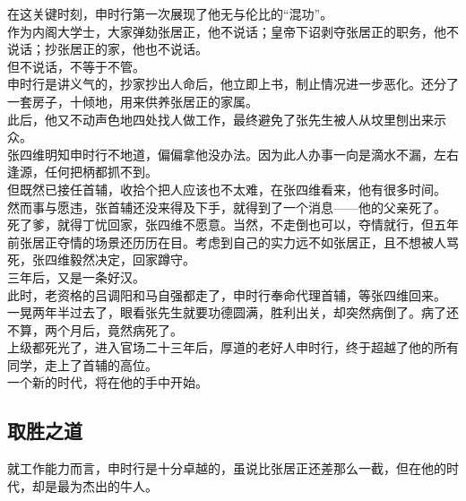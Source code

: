 \begin{multicols}{\theparacolNo}
在这关键时刻，申时行第一次展现了他无与伦比的“混功”。\\

作为内阁大学士，大家弹劾张居正，他不说话；皇帝下诏剥夺张居正的职务，他不说话；抄张居正的家，他也不说话。\\

但不说话，不等于不管。\\

申时行是讲义气的，抄家抄出人命后，他立即上书，制止情况进一步恶化。还分了一套房子，十倾地，用来供养张居正的家属。\\

此后，他又不动声色地四处找人做工作，最终避免了张先生被人从坟里刨出来示众。\\

张四维明知申时行不地道，偏偏拿他没办法。因为此人办事一向是滴水不漏，左右逢源，任何把柄都抓不到。\\

但既然已接任首辅，收拾个把人应该也不太难，在张四维看来，他有很多时间。\\

然而事与愿违，张首辅还没来得及下手，就得到了一个消息——他的父亲死了。\\

死了爹，就得丁忧回家，张四维不愿意。当然，不走倒也可以，夺情就行，但五年前张居正夺情的场景还历历在目。考虑到自己的实力远不如张居正，且不想被人骂死，张四维毅然决定，回家蹲守。\\

三年后，又是一条好汉。\\

此时，老资格的吕调阳和马自强都走了，申时行奉命代理首辅，等张四维回来。\\

一晃两年半过去了，眼看张先生就要功德圆满，胜利出关，却突然病倒了。病了还不算，两个月后，竟然病死了。\\

上级都死光了，进入官场二十三年后，厚道的老好人申时行，终于超越了他的所有同学，走上了首辅的高位。\\

一个新的时代，将在他的手中开始。\\

\subsection{取胜之道}
就工作能力而言，申时行是十分卓越的，虽说比张居正还差那么一截，但在他的时代，却是最为杰出的牛人。\\


\end{multicols}
